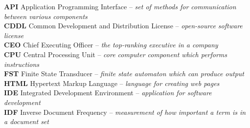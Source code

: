 \documentclass[12pt,a4paper]{report}
\begin{document}



\tableofcontents












\listoffigures



\textbf{API} Application Programming Interface – \textit{set of methods for communication between various components}
\\

\textbf{CDDL} Common Development and Distribution License – \textit{open-source software license}
\\

\textbf{CEO} Chief Executing Officer – \textit{the top-ranking executive in a company}
\\

\textbf{CPU} Central Processing Unit – \textit{core computer component which performs instructions}
\\

\textbf{FST} Finite State Transducer – \textit{finite state automaton which can produce output}
\\

\textbf{HTML} Hypertext Markup Language – \textit{language for creating web pages}
\\

\textbf{IDE} Integrated Development Environment – \textit{application for software development}
\\

\textbf{IDF} Inverse Document Frequency – \textit{measurement of how important a term is in a document set}
\\
\end{document}
